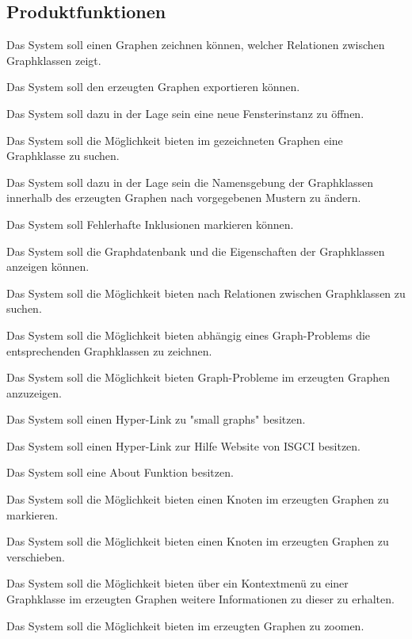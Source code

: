 \documentclass[11pt,a4paper]{article}
\begin{document}
  	\subsection{Produktfunktionen} %
  	
	\begin{description}[leftmargin=.9cm]
\item[1] Das System soll einen Graphen zeichnen können, welcher Relationen zwischen Graphklassen zeigt.
\item[2] Das System soll den erzeugten Graphen exportieren können.
\item[3] Das System soll dazu in der Lage sein eine neue Fensterinstanz zu öffnen.
\item[4] Das System soll die Möglichkeit bieten im gezeichneten Graphen eine Graphklasse zu suchen. 
\item[5] Das System soll dazu in der Lage sein die Namensgebung der Graphklassen innerhalb des erzeugten Graphen nach vorgegebenen Mustern zu ändern.
\item[6] Das System soll Fehlerhafte Inklusionen markieren können.
\item[7] Das System soll die Graphdatenbank und die Eigenschaften der Graphklassen anzeigen können. 
\item[8] Das System soll die Möglichkeit bieten nach Relationen zwischen Graphklassen zu suchen.
\item[9] Das System soll die Möglichkeit bieten abhängig eines Graph-Problems die entsprechenden Graphklassen zu zeichnen.
\item[10] Das System soll die Möglichkeit bieten Graph-Probleme im erzeugten Graphen anzuzeigen.
\item[11] Das System soll einen Hyper-Link zu "small graphs" besitzen.
\item[12] Das System soll einen Hyper-Link zur Hilfe Website von ISGCI besitzen.
\item[13] Das System soll eine About Funktion besitzen.
\item[14] Das System soll die Möglichkeit bieten einen Knoten im erzeugten Graphen zu markieren.
\item[15] Das System soll die Möglichkeit bieten einen Knoten im erzeugten Graphen zu verschieben.
\item[16] Das System soll die Möglichkeit bieten über ein Kontextmenü zu einer Graphklasse im erzeugten Graphen weitere Informationen zu dieser zu erhalten.
\item[17] Das System soll die Möglichkeit bieten im erzeugten Graphen zu zoomen.

\end{description}
\end{document}
